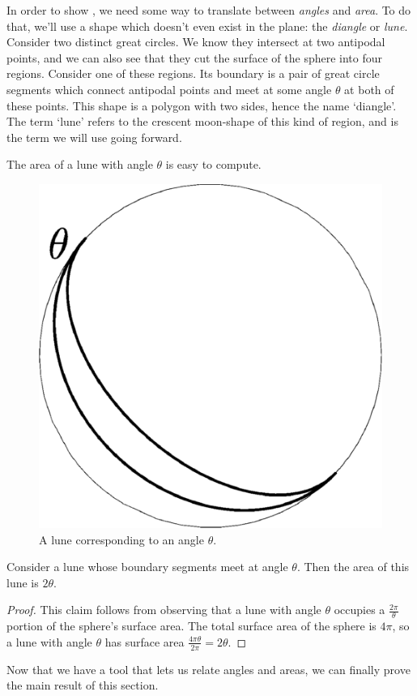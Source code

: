 In order to  show , we need some way to translate between \textit{angles} and \textit{area}.  To do that, we'll use a shape which doesn't even exist in the plane: the \textit{diangle} or \textit{lune}.  Consider two distinct great circles.  We know they intersect at two antipodal points, and we can also see that they cut the surface of the sphere into four regions.  Consider one of these regions.  Its boundary is a pair of great circle segments which connect antipodal points and meet at some angle $\theta$ at both of these points.  This shape is a polygon with two sides, hence the name `diangle'.  The term `lune' refers to the crescent moon-shape of this kind of region, and is the term we will use going forward.  

The area of a lune with angle $\theta$ is easy to compute.


\begin{figure}[htb]
	\centering
	\includegraphics[width=.35\textwidth]{figs/lune.pdf}
	\caption{A lune corresponding to an angle $\theta$. }
	\label{fig:lune}
\end{figure}

\begin{claim}
	Consider a lune whose boundary segments meet at angle $\theta$.  Then the area of this lune is $2\theta$.
\end{claim}
\begin{proof}
	This claim follows from observing that a lune with angle $\theta$ occupies a $\tfrac{2\pi}{\theta}$ portion of the sphere's surface area.  The total surface area of the sphere is $4\pi$, so a lune with angle $\theta$ has surface area $\tfrac{4\pi\theta}{2\pi}= 2\theta$.
\end{proof}

Now that we have a tool that lets us relate angles and areas, we can finally prove the main result of this section.










